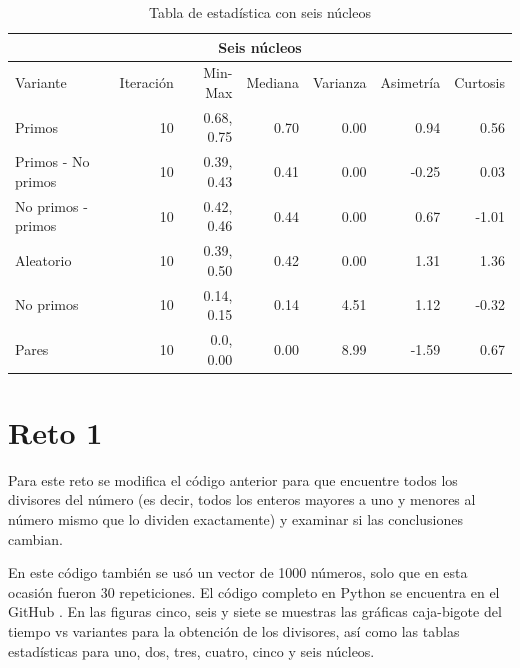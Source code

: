 \documentclass{article}
\begin{document}
\begin{table}[H]
\begin{center}
\begin{tabular}{|l | r | r | r | r | r | r|}
\hline
\multicolumn{7}{|c|}{Seis núcleos}\\
\hline
Variante&Iteración&Min-Max&Mediana&Varianza&Asimetría&Curtosis\\
\hline
 Primos               & 10 & 0.68, 0.75  & 0.70 & 0.00 & 0.94   & 0.56\\
 Primos - No primos   & 10 & 0.39, 0.43  & 0.41 & 0.00 & -0.25  & 0.03\\
 No primos - primos   & 10 & 0.42, 0.46  &0.44 & 0.00  & 0.67   & -1.01\\
 Aleatorio            & 10 & 0.39, 0.50  & 0.42 & 0.00 & 1.31   & 1.36\\
 No primos            & 10 & 0.14, 0.15  & 0.14 & 4.51 & 1.12   &-0.32\\
 Pares                & 10 & 0.0, 0.00  & 0.00 & 8.99  & -1.59  & 0.67\\
\hline
\end{tabular}
\caption{Tabla de estadística con seis núcleos}
\label{table:1}
\end{center}
\end{table}

\section{Reto 1}
Para este reto se modifica el código anterior para que encuentre todos los divisores del número (es decir, todos los enteros mayores a uno y menores al número mismo que lo dividen exactamente) y examinar si las conclusiones cambian.

En este código también se usó un vector de 1000 números, solo que en esta ocasión fueron 30 repeticiones. El código completo en Python se encuentra en el GitHub \cite{Denisse_Leyva}.
En las figuras cinco, seis y siete se muestras las gráficas caja-bigote del tiempo vs variantes para la obtención de los divisores, así como las tablas estadísticas para uno, dos, tres, cuatro, cinco y seis núcleos.
\end{document}
